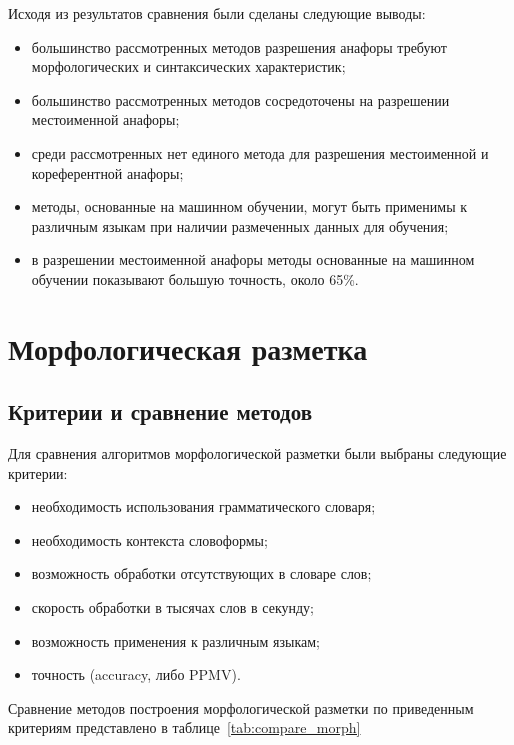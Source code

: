 Исходя из результатов сравнения были сделаны следующие выводы:
\begin{itemize}
	\item большинство рассмотренных методов разрешения анафоры требуют морфологических и синтаксических характеристик;
	\item большинство рассмотренных методов сосредоточены на разрешении местоименной анафоры;
	\item среди рассмотренных нет единого метода для разрешения местоименной и кореферентной анафоры;
	\item методы, основанные на машинном обучении, могут быть применимы к различным языкам при наличии размеченных данных для обучения;
	\item в разрешении местоименной анафоры методы основанные на машинном обучении показывают большую точность, около 65\%.
\end{itemize}

\section{Морфологическая разметка}
\subsection{Критерии и сравнение методов}
Для сравнения алгоритмов морфологической разметки были выбраны следующие критерии:
\begin{itemize}
	\item необходимость использования грамматического словаря;
	\item необходимость контекста словоформы;
	\item возможность обработки отсутствующих в словаре слов;
	\item скорость обработки в тысячах слов в секунду;
	\item возможность применения к различным языкам;
	\item точность (accuracy, либо PPMV).
\end{itemize}

Сравнение методов построения морфологической разметки по приведенным критериям представлено в таблице~\ref{tab:compare_morph}

